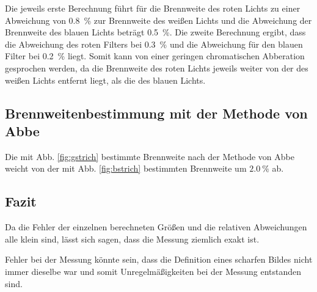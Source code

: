 \noindent Die jeweils erste Berechnung führt für die Brennweite des roten Lichts zu einer Abweichung von \SI{0.8}{\percent} zur Brennweite des weißen Lichts und die Abweichung der Brennweite des blauen Lichts beträgt \SI{0.5}{\percent}. Die zweite Berechnung ergibt, dass die Abweichung des roten Filters bei \SI{0.3}{\percent} und die Abweichung für den blauen Filter bei \SI{0.2}{\percent} liegt. Somit kann von einer geringen chromatischen Abberation gesprochen werden, da die Brennweite des roten Lichts jeweils weiter von der des weißen Lichts entfernt liegt, als die des blauen Lichts. 

\subsection{Brennweitenbestimmung mit der Methode von Abbe}
Die mit Abb. \ref{fig:gstrich} bestimmte Brennweite nach der Methode von Abbe weicht von der mit Abb. \ref{fig:bstrich} bestimmten Brennweite um $\SI{2.0}{\percent}$ ab.

\subsection{Fazit}
Da die Fehler der einzelnen berechneten Größen und die relativen Abweichungen alle klein sind, lässt sich sagen, dass die Messung ziemlich exakt ist.

\noindent Fehler bei der Messung könnte sein, dass die Definition eines scharfen Bildes nicht immer dieselbe war und somit Unregelmäßigkeiten bei der Messung entstanden sind.
